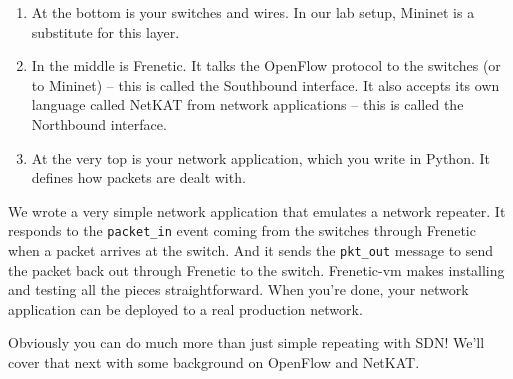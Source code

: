 \begin{enumerate}
\item At the bottom is your switches and wires.  In our lab setup, Mininet is a substitute for this layer.
\item In the middle is Frenetic.  It talks the OpenFlow protocol to the switches (or to Mininet) -- this is called the Southbound interface.  It also accepts its own language called NetKAT from network applications -- this is called the Northbound interface.
\item At the very top is your network application, which you write in Python.  It defines how packets are dealt with.
\end{enumerate}

We wrote a very simple network application that emulates a network repeater.   
It responds to the \lstinline{packet_in} event coming from the switches through Frenetic when a packet 
arrives at the switch.  
And it sends the \lstinline{pkt_out} message to send the packet back out through Frenetic to the switch.  
Frenetic-vm makes installing and testing all the pieces straightforward. 
When you're done, your network application can be deployed to a real production network.

Obviously you can do much more than just simple repeating with SDN!  
We'll cover that next with some background on OpenFlow and NetKAT.  